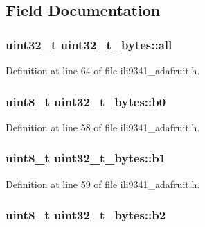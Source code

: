\subsection{Field Documentation}
\hypertarget{unionuint32__t__bytes_a83b0c87830b60d185365dbadf8efd4a0}{
\subsubsection[{all}]{\setlength{\rightskip}{0pt plus 5cm}uint32\-\_\-t uint32\-\_\-t\-\_\-bytes\-::all}}\label{unionuint32__t__bytes_a83b0c87830b60d185365dbadf8efd4a0}


Definition at line 64 of file ili9341\-\_\-adafruit.\-h.

\hypertarget{unionuint32__t__bytes_a92b86537decb69327191d870f41c60f7}{
\subsubsection[{b0}]{\setlength{\rightskip}{0pt plus 5cm}uint8\-\_\-t uint32\-\_\-t\-\_\-bytes\-::b0}}\label{unionuint32__t__bytes_a92b86537decb69327191d870f41c60f7}


Definition at line 58 of file ili9341\-\_\-adafruit.\-h.

\hypertarget{unionuint32__t__bytes_a91fb31482a2ce44b454fca964dcd556b}{
\subsubsection[{b1}]{\setlength{\rightskip}{0pt plus 5cm}uint8\-\_\-t uint32\-\_\-t\-\_\-bytes\-::b1}}\label{unionuint32__t__bytes_a91fb31482a2ce44b454fca964dcd556b}


Definition at line 59 of file ili9341\-\_\-adafruit.\-h.

\hypertarget{unionuint32__t__bytes_a462312b99de0c6d1c497064902196e1d}{
\subsubsection[{b2}]{\setlength{\rightskip}{0pt plus 5cm}uint8\-\_\-t uint32\-\_\-t\-\_\-bytes\-::b2}}\label{unionuint32__t__bytes_a462312b99de0c6d1c497064902196e1d}


